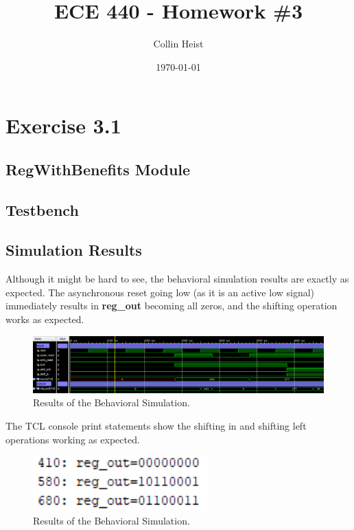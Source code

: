 \documentclass[a4paper, 12pt]{article}
\let\counterwithin\relax
\begin{document}
\counterwithin{lstlisting}{section} %
\title{ECE 440 - Homework \#3}
\author{Collin Heist}
\date{\today}
\maketitle


\section{Exercise 3.1}
\subsection{RegWithBenefits Module}
\begin{mdframed}[backgroundcolor=code-gray, roundcorner=10pt, innerleftmargin=15, innertopmargin=5, innerbottommargin=5]	

\end{mdframed}

\subsection{Testbench}
\begin{mdframed}[backgroundcolor=code-gray, roundcorner=10pt, innerleftmargin=15, innertopmargin=5, innerbottommargin=5]	

\end{mdframed}

\subsection{Simulation Results}
Although it might be hard to see, the behavioral simulation results are exactly as expected. The asynchronous reset going low (as it is an active low signal) immediately results in \textbf{reg\_out} becoming all zeros, and the shifting operation works as expected.

\begin{figure}[H]
\centering
\includegraphics[width=\textwidth]{Sources/Behav-Sim.PNG}
\caption{Results of the Behavioral Simulation.}
\end{figure}

The TCL console print statements show the shifting in and shifting left operations working as expected.

\begin{figure}[H]
\centering
\includegraphics[width=0.6\textwidth]{Sources/console.PNG}
\caption{Results of the Behavioral Simulation.}
\end{figure}
\end{document}

